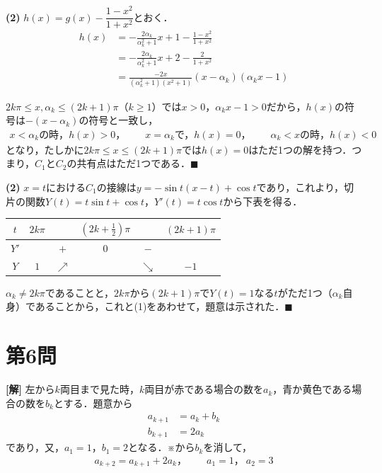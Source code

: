 \documentclass[../main.tex]{subfiles}
\begin{document}
\textbf{(2)} $h(x)=g(x)-\dfrac{1-x^2}{1+x^2}$とおく．
\begin{align*}
  h(x)&=-\frac{2\alpha_k}{\alpha_k^2+1}x+1-\frac{1-x^2}{1+x^2}\\
  &=-\frac{2\alpha_k}{\alpha_k^2+1}x+2-\frac2{1+x^2}\\
  &=\frac{-2x}{(\alpha_k^2+1)(x^2+1)}(x-\alpha_k)(\alpha_kx-1)
\end{align*}

$2k\pi\le x,\alpha_k\le(2k+1)\pi$（$k\ge1$）では$x>0$，$\alpha_kx-1>0$だから，$h(x)$の符号は$-(x-\alpha_k)$の符号と一致し，
\begin{align*}
  x<\alpha_k\text{の時，}h(x)>0，\qquad x=\alpha_k\text{で，}h(x)=0，\qquad\alpha_k<x\text{の時，}h(x)<0
\end{align*}
となり，たしかに$2k\pi\le x\le(2k+1)\pi$では$h(x)=0$はただ1つの解を持つ．つまり，$C_1$と$C_2$の共有点はただ1つである．$\blacksquare$

\bigskip
\noindent{\bf [解2]}
\textbf{(2)} $x=t$における$C_1$の接線は$y=-\sin t(x-t)+\cos t$であり，これより，切片の関数$Y(t)=t\sin t+\cos t$，$Y'(t)=t\cos t$から下表を得る．

\begin{center}
  \begin{tabular}{c|ccccc}
    $t$ & $2k\pi$ & & $\left(2k+\frac12\right)\pi$ & & $(2k+1)\pi$ \\
    \hline
    $Y'$ & & $+$ & $0$ & $-$ & \\
    \hline
    $Y$ & $1$ & $\nearrow$ & & $\searrow$ & $-1$ \\
  \end{tabular}
\end{center}

$\alpha_k\ne2k\pi$であることと，$2k\pi$から$(2k+1)\pi$で$Y(t)=1$なる$t$がただ1つ（$\alpha_k$自身）であることから，これと(1)をあわせて，題意は示された．$\blacksquare$

\newpage

\section*{第6問}

{\bf [解]}
左から$k$両目まで見た時，$k$両目が赤である場合の数を$a_k$，青か黄色である場合の数を$b_k$とする．題意から
\begin{align*}
  a_{k+1}&=a_k+b_k\\
  b_{k+1}&=2a_k
\end{align*}
であり，又，$a_1=1$，$b_1=2$となる．※から$b_k$を消して，
\begin{align*}
  a_{k+2}=a_{k+1}+2a_k，\qquad a_1=1，\ a_2=3
\end{align*}
\end{document}
